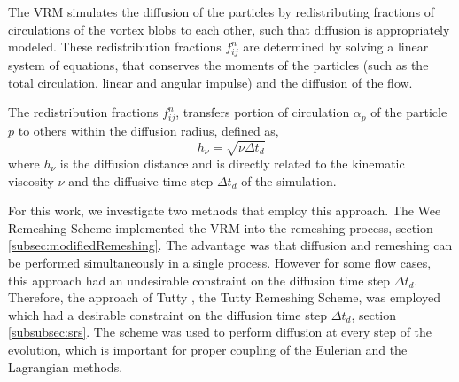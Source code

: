 The VRM simulates the diffusion of the particles by redistributing fractions of circulations of the vortex blobs to each other, such that diffusion is appropriately modeled. These redistribution fractions $f_{ij}^n$ are determined by solving a linear system of equations, that conserves the moments of the particles (such as the total circulation, linear and angular impulse) and the diffusion of the flow. 

The redistribution fractions $f_{ij}^n$, transfers portion of circulation $\alpha_p$ of the particle $p$ to others within the diffusion radius, defined as,
	\begin{equation}
	h_{\nu} = \sqrt{\nu\Delta t_d}
	\label{eq:la_diffDis}
	\end{equation}
where $h_{\nu}$ is the diffusion distance and is directly related to the kinematic viscosity $\nu$ and the diffusive time step $\Delta t_d$ of the simulation.

For this work, we investigate two methods that employ this approach. The Wee Remeshing Scheme \cite{Wee2006a} implemented the VRM into the remeshing process, section \ref{subsec:modifiedRemeshing}. The advantage was that diffusion and remeshing can be performed simultaneously in a single process. However for some flow cases, this approach had an undesirable constraint on the diffusion time step $\Delta t_d$. Therefore, the approach of Tutty \cite{Tutty2010a}, the Tutty Remeshing Scheme, was employed which had a desirable constraint on the diffusion time step $\Delta t_d$, section \ref{subsubsec:srs}. The scheme was used to perform diffusion at every step of the evolution, which is important for proper coupling of the Eulerian and the Lagrangian methods.





